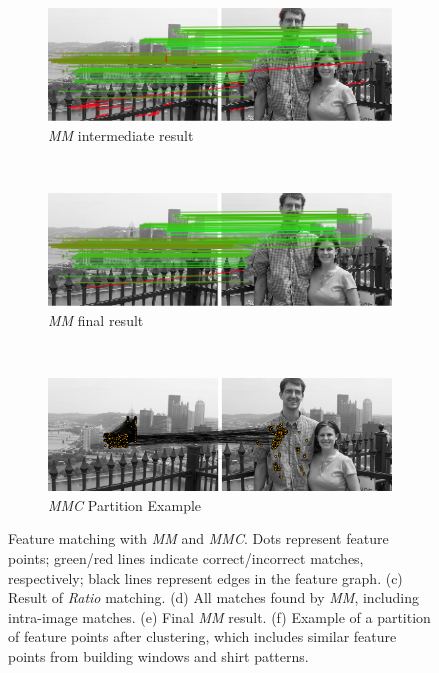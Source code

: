 \documentclass{article}
\begin{document}
\begin{figure}
		\\ %
		\begin{subfigure}[t]{\columnwidth}
			\centering
			\includegraphics[width=0.85\columnwidth]{images/mirror_match_with_pruned}
			\caption{\emph{MM} intermediate result}
			\label{fig:within}
		\end{subfigure}%
		\\ %
		\begin{subfigure}[t]{\columnwidth}
			\centering
			\includegraphics[width=0.85\columnwidth]{images/mirror_match}
			\caption{\emph{MM} final result}
			\label{fig:without}
		\end{subfigure}%
		\\ %
		\begin{subfigure}[t]{\columnwidth}
			\centering
			\includegraphics[width=0.85\columnwidth]{images/MMC_partition}
			\caption{\emph{MMC} Partition Example}
			\label{fig:pitts_partition}
		\end{subfigure}%
	\caption{Feature matching with \emph{MM} and \emph{MMC}. Dots represent feature points; green/red lines indicate correct/incorrect matches, respectively; black lines represent edges in the feature graph.  
	(c) Result of \emph{Ratio} matching. 
  (d) All matches found by \emph{MM}, including intra-image matches. 
	(e) Final \emph{MM} result. 
	(f) Example of a partition of feature points after clustering, which 
includes similar feature points from building windows and shirt patterns.}%
	\label{fig:comparemirror}%
\end{figure}%
\end{document}
